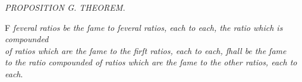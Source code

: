 \documentclass[12pt,preview]{standalone}
\begin{document}
\begin{minipage}{\textwidth}

    \begin{center}
        \textit{PROPOSITION G. THEOREM.}\label{book5prG} \\
    \end{center}

    \hfill

    \begin{center}
        \raggedright \lettrine[lines=4, loversize=1, nindent=0pt]{}{}F \textit{ſeveral ratios be the ſame to ſeveral ratios, each to each, the ratio which is compounded\\ of ratios which are the ſame to the firſt ratios, each to each, ſhall be the ſame\\ to the ratio compounded of ratios which are the ſame to the other ratios, each to each}.
    \end{center}

    \hfill

    \hfill

    \begin{center}
    \end{center}

    \hfill

    \hfill


\end{minipage}
\end{document}
